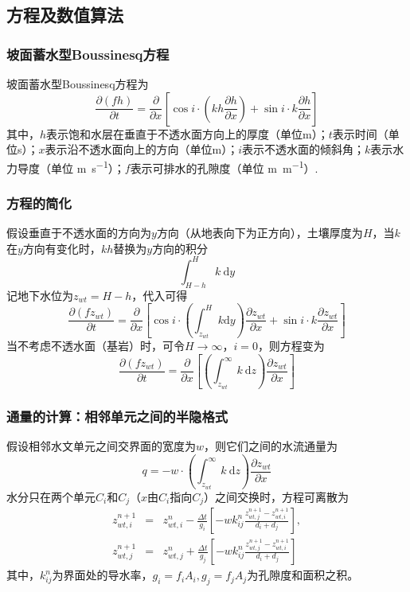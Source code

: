 \subsection{方程及数值算法}
\subsubsection{坡面蓄水型Boussinesq方程}
坡面蓄水型Boussinesq方程为
\begin{equation}
\frac{\partial \left(fh\right)}{\partial t} = \frac{\partial}{\partial x} \left[\cos i \cdot \left(kh\frac{\partial h}{\partial x}\right)+\sin i\cdot k\frac{\partial h}{\partial x}\right]
\end{equation}
其中，$h$表示饱和水层在垂直于不透水面方向上的厚度（单位m）；$t$表示时间（单位s）；$x$表示沿不透水面向上的方向（单位m）；$i$表示不透水面的倾斜角；$k$表示水力导度（单位 \unit{m.s^{-1}}）；$f$表示可排水的孔隙度（单位 \unit{m.m^{-1}}）.

\subsubsection{方程的简化}
假设垂直于不透水面的方向为$y$方向（从地表向下为正方向），土壤厚度为$H$，当$k$在$y$方向有变化时，$kh$替换为$y$方向的积分
\begin{equation}
\int^H_{H-h} k \  \mathrm{d}y
\end{equation}
记地下水位为$z_{wt}=H-h$，代入可得
\begin{equation}
\frac{\partial \left(fz_{wt}\right)}{\partial t} = \frac{\partial}{\partial x} \left[ \cos i \cdot \left(\int^{H}_{z_{wt}} k \mathrm{d}y\right)\frac{\partial z_{wt}}{\partial x} +\sin i\cdot k\frac{\partial z_{wt}}{\partial x}\right]
\end{equation}
当不考虑不透水面（基岩）时，可令$H\to \infty$，$i=0$，则方程变为
\begin{equation}
\frac{\partial \left(fz_{wt}\right)}{\partial t} = \frac{\partial}{\partial x} \left[ \left(\int^\infty_{z_{wt}} k\ \mathrm{d}z\right)\frac{\partial z_{wt}}{\partial x} \right]
\end{equation}

\subsubsection{通量的计算：相邻单元之间的半隐格式}
假设相邻水文单元之间交界面的宽度为$w$，则它们之间的水流通量为
$$q=-w\cdot \left(\int^\infty_{z_{wt}} k\ \mathrm{d}z\right)\frac{\partial z_{wt}}{\partial x} $$
水分只在两个单元$C_i$和$C_j$（$x$由$C_i$指向$C_j$）之间交换时，方程可离散为
\begin{eqnarray}
z_{wt,i}^{n+1} &=& z_{wt,i}^{n} - \frac{\Delta t}{g_i}\left[ -  w k^n_{ij} \frac{z_{wt,j}^{n+1} - z_{wt,i}^{n+1}}{d_i+d_j} \right], \\
z_{wt,j}^{n+1} &=& z_{wt,j}^{n} + \frac{\Delta t}{g_j}\left[ -  w k^n_{ij} \frac{z_{wt,j}^{n+1} - z_{wt,i}^{n+1}}{d_i+d_j} \right]
\end{eqnarray}
其中，$k^n_{ij}$为界面处的导水率，$g_i=f_iA_i,g_j=f_jA_j$为孔隙度和面积之积。

